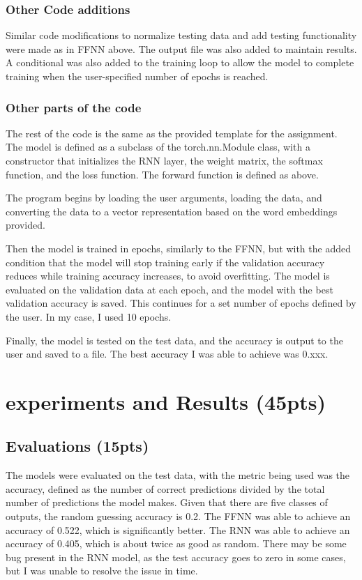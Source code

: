 \documentclass[conference]{IEEEtran}
\begin{document}
\subsubsection{Other Code additions}

Similar code modifications to normalize testing data and add testing functionality were made as in FFNN above. The output file was also added to maintain results. A conditional was also added to the training loop to allow the model to complete training when the user-specified number of epochs is reached.

\subsubsection{Other parts of the code}

The rest of the code is the same as the provided template for the assignment. The model is defined as a subclass of the torch.nn.Module class, with a constructor that initializes the RNN layer, the weight matrix, the softmax function, and the loss function. The forward function is defined as above. 

The program begins by loading the user arguments, loading the data, and converting the data to a vector representation based on the word embeddings provided.

Then the model is trained in epochs, similarly to the FFNN, but with the added condition that the model will stop training early if the validation accuracy reduces while training accuracy increases, to avoid overfitting. The model is evaluated on the validation data at each epoch, and the model with the best validation accuracy is saved. This continues for a set number of epochs defined by the user. In my case, I used 10 epochs.

Finally, the model is tested on the test data, and the accuracy is output to the user and saved to a file. The best accuracy I was able to achieve was 0.xxx.


\section{experiments and Results (45pts)}

\subsection{Evaluations (15pts)}

The models were evaluated on the test data, with the metric being used was the accuracy, defined as the number of correct predictions divided by the total number of predictions the model makes.
Given that there are five classes of outputs, the random guessing accuracy is 0.2. 
The FFNN was able to achieve an accuracy of 0.522, which is significantly better. 
The RNN was able to achieve an accuracy of 0.405, which is about twice as good as random. 
There may be some bug present in the RNN model, as the test accuracy goes to zero in some cases, but I was unable to resolve the issue in time.
\end{document}
